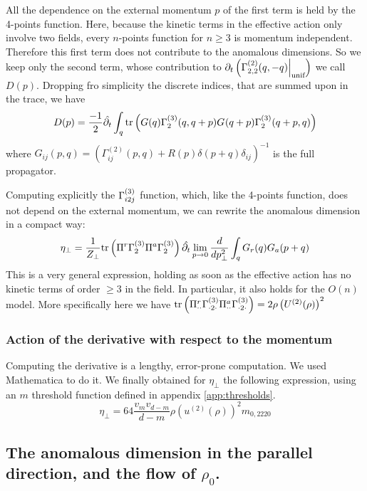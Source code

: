All the dependence on the external momentum $p$ of the first term is held by the 4-points function. Here, because the kinetic terms in the effective action only involve two fields, every $n$-points function for $n \geq 3$ is momentum independent. Therefore this first term does not contribute to the anomalous dimensions.
So we keep only the second term, whose contribution to $\partial_{t} \left ( \Gamma^{(2)}_{2,2}(q,-q)  \Big|_{\text{unif}}  \right )$  we call $D(p)$. Dropping fro simplicity the discrete indices, that are summed upon in the trace, we have
\begin{equation}
D(p) = \frac{-1}{2} \hat{\partial_{t}} \int_q  \text{tr}\left( G(q)\Gamma^{(3)}_{2}(q, q + p) G_{}(q + p) \Gamma^{(3)}_{2}(q + p, q) \right) 
\end{equation}
where $G_{ij}(p,q) = \left ( \Gamma^{(2)}_{ij}(p,q) + R(p)\delta(p+q)\delta_{ij} \right )^{-1}$ is the full propagator.

Computing explicitly the $\Gamma^{(3)}_{i2j}$ function, which, like the 4-points function, does not depend on the external momentum, we can rewrite the anomalous dimension in a compact way:
\begin{align}
\eta_\perp = \frac{1}{Z_\perp}  \text{tr}\left(\Pi^r\Gamma^{(3)}_{2} \Pi^a \Gamma^{(3)}_{2}\right)  \hat{\partial_{t}} \lim_{p \rightarrow 0} \frac{d}{dp^2_\perp} \int_q G_r(q) G_a(p+q)
\end{align}
This is a very general expression, holding as soon as the effective action has no kinetic terms of order $\geq 3$ in the field. In particular, it also holds for the $O(n)$ model.
More specifically here we have $ \text{tr}\left(\Pi^r_{\cdot \cdot} \Gamma^{(3)}_{\cdot2\cdot} \Pi^a_{\cdot \cdot} \Gamma^{(3)}_{\cdot2\cdot}\right)  = 2 \rho \left ( U^{(2)}(\rho) \right )^2$

\subsubsection{Action of the derivative with respect to the momentum}
Computing the derivative is a lengthy, error-prone computation. We used Mathematica to do it.
We finally obtained for $\eta_\perp$ the following expression, using an $m$ threshold function defined in appendix \eqref{app:thresholds}.
\begin{equation}
\label{eq:flow_perp}
\eta_\perp = 64 \frac{v_m v_{d-m}}{d-m} \rho \left( u^{(2)}(\rho) \right)^2 m_{0,2220}
\end{equation}

\subsection{The anomalous dimension in the parallel direction, and the flow of $\rho_0$.}

